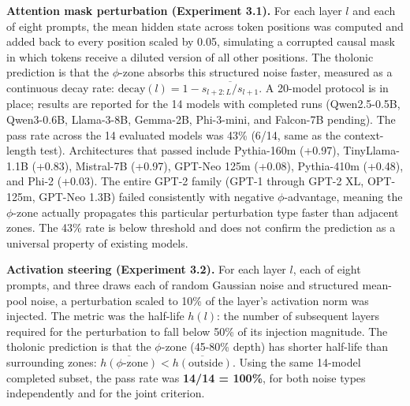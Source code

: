 \documentclass[12pt]{article}
\begin{document}
\textbf{Attention mask perturbation (Experiment 3.1).} For each layer
\(l\) and each of eight prompts, the mean hidden state across token
positions was computed and added back to every position scaled by 0.05,
simulating a corrupted causal mask in which tokens receive a diluted
version of all other positions. The tholonic prediction is that the
\(\phi\)-zone absorbs this structured noise faster, measured as a
continuous decay rate:
\(\text{decay}(l) = 1 - \overline{s_{l+2:L}/s_{l+1}}\). A 20-model
protocol is in place; results are reported for the 14 models with
completed runs (Qwen2.5-0.5B, Qwen3-0.6B, Llama-3-8B, Gemma-2B,
Phi-3-mini, and Falcon-7B pending). The pass rate across the 14
evaluated models was 43\% (6/14, same as the context-length test).
Architectures that passed include Pythia-160m (+0.97), TinyLlama-1.1B
(+0.83), Mistral-7B (+0.97), GPT-Neo 125m (+0.08), Pythia-410m (+0.48),
and Phi-2 (+0.03). The entire GPT-2 family (GPT-1 through GPT-2 XL,
OPT-125m, GPT-Neo 1.3B) failed consistently with negative
\(\phi\)-advantage, meaning the \(\phi\)-zone actually propagates this
particular perturbation type faster than adjacent zones. The 43\% rate
is below threshold and does not confirm the prediction as a universal
property of existing models.

\textbf{Activation steering (Experiment 3.2).} For each layer \(l\),
each of eight prompts, and three draws each of random Gaussian noise and
structured mean-pool noise, a perturbation scaled to 10\% of the layer's
activation norm was injected. The metric was the half-life \(h(l)\): the
number of subsequent layers required for the perturbation to fall below
50\% of its injection magnitude. The tholonic prediction is that the
\(\phi\)-zone (45-80\% depth) has shorter half-life than surrounding
zones:
\(\overline{h(\phi\text{-zone})} < \overline{h(\text{outside})}\). Using
the same 14-model completed subset, the pass rate was \textbf{14/14 =
100\%}, for both noise types independently and for the joint criterion.
\end{document}

